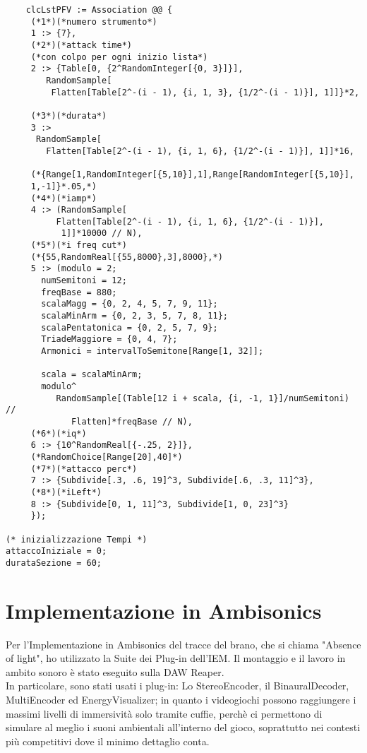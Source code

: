 \begin{lstlisting}
    clcLstPFV := Association @@ {
     (*1*)(*numero strumento*)
     1 :> {7},
     (*2*)(*attack time*)
     (*con colpo per ogni inizio lista*)
     2 :> {Table[0, {2^RandomInteger[{0, 3}]}], 
        RandomSample[
         Flatten[Table[2^-(i - 1), {i, 1, 3}, {1/2^-(i - 1)}], 1]]}*2,
     
     (*3*)(*durata*)
     3 :> 
      RandomSample[
        Flatten[Table[2^-(i - 1), {i, 1, 6}, {1/2^-(i - 1)}], 1]]*16,
     
     (*{Range[1,RandomInteger[{5,10}],1],Range[RandomInteger[{5,10}],
     1,-1]}*.05,*)
     (*4*)(*iamp*)
     4 :> (RandomSample[
          Flatten[Table[2^-(i - 1), {i, 1, 6}, {1/2^-(i - 1)}], 
           1]]*10000 // N),
     (*5*)(*i freq cut*)
     (*{55,RandomReal[{55,8000},3],8000},*)
     5 :> (modulo = 2;
       numSemitoni = 12;
       freqBase = 880;
       scalaMagg = {0, 2, 4, 5, 7, 9, 11};
       scalaMinArm = {0, 2, 3, 5, 7, 8, 11};
       scalaPentatonica = {0, 2, 5, 7, 9};
       TriadeMaggiore = {0, 4, 7};
       Armonici = intervalToSemitone[Range[1, 32]];
       
       scala = scalaMinArm;
       modulo^
          RandomSample[(Table[12 i + scala, {i, -1, 1}]/numSemitoni) //
             Flatten]*freqBase // N),
     (*6*)(*iq*)
     6 :> {10^RandomReal[{-.25, 2}]},
     (*RandomChoice[Range[20],40]*)
     (*7*)(*attacco perc*)
     7 :> {Subdivide[.3, .6, 19]^3, Subdivide[.6, .3, 11]^3},
     (*8*)(*iLeft*)
     8 :> {Subdivide[0, 1, 11]^3, Subdivide[1, 0, 23]^3}
     });

(* inizializzazione Tempi *)
attaccoIniziale = 0;
durataSezione = 60;
\end{lstlisting}

\section{Implementazione in Ambisonics}
Per l'Implementazione in Ambisonics del tracce del brano, che si chiama "Absence of light", ho utilizzato la Suite dei Plug-in dell'IEM.
Il montaggio e il lavoro in ambito sonoro è stato eseguito sulla DAW Reaper.\\
In particolare, sono stati usati i plug-in: Lo StereoEncoder, il BinauralDecoder, MultiEncoder ed EnergyVisualizer; in quanto i videogiochi possono raggiungere i massimi
livelli di immersività solo tramite cuffie, perchè ci permettono di simulare al meglio i suoni ambientali all'interno del gioco, 
soprattutto nei contesti più competitivi dove il minimo dettaglio conta.

